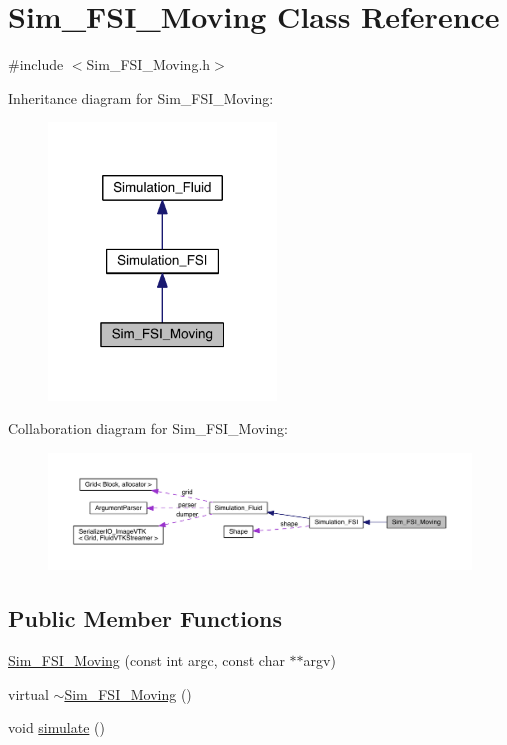 \hypertarget{class_sim___f_s_i___moving}{}\section{Sim\+\_\+\+F\+S\+I\+\_\+\+Moving Class Reference}
\label{class_sim___f_s_i___moving}


{\ttfamily \#include $<$Sim\+\_\+\+F\+S\+I\+\_\+\+Moving.\+h$>$}



Inheritance diagram for Sim\+\_\+\+F\+S\+I\+\_\+\+Moving\+:
\nopagebreak
\begin{figure}[H]
\begin{center}
\leavevmode
\includegraphics[width=172pt]{d7/d58/class_sim___f_s_i___moving__inherit__graph}
\end{center}
\end{figure}


Collaboration diagram for Sim\+\_\+\+F\+S\+I\+\_\+\+Moving\+:
\nopagebreak
\begin{figure}[H]
\begin{center}
\leavevmode
\includegraphics[width=350pt]{d2/d99/class_sim___f_s_i___moving__coll__graph}
\end{center}
\end{figure}
\subsection*{Public Member Functions}
\begin{DoxyCompactItemize}
\item 
\hyperlink{class_sim___f_s_i___moving_a6bf59570d685a1bb99517fb4a1aa010e}{Sim\+\_\+\+F\+S\+I\+\_\+\+Moving} (const int argc, const char $\ast$$\ast$argv)
\item 
virtual \hyperlink{class_sim___f_s_i___moving_a7de21a74e73f85426584ec607abc06ee}{$\sim$\+Sim\+\_\+\+F\+S\+I\+\_\+\+Moving} ()
\item 
void \hyperlink{class_sim___f_s_i___moving_ae20d894ac95fb1e13de88147a8bc1b3e}{simulate} ()
\end{DoxyCompactItemize}
